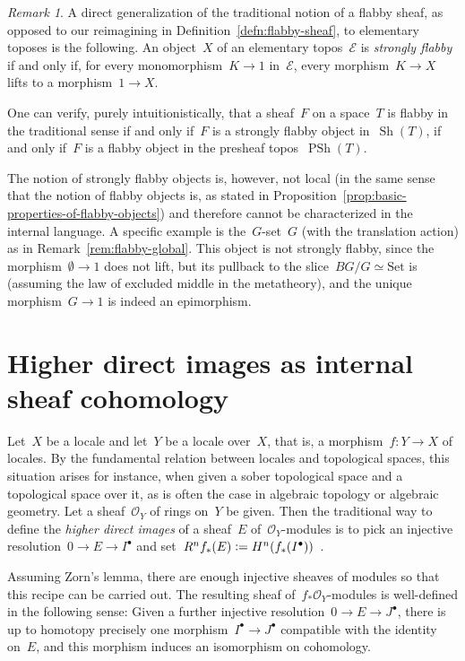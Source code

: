\documentclass[oneside]{amsart}
\theoremstyle{definition}
\theoremstyle{plain}
\theoremstyle{remark}
\newtheorem{rem}[defn]{Remark}
\newcommand{\E}{\mathcal{E}}
\renewcommand{\O}{\mathcal{O}}
\newcommand{\defeq}{\vcentcolon=}
\DeclareMathOperator{\Sh}{Sh}
\DeclareMathOperator{\PSh}{PSh}
\newcommand{\Set}{\mathrm{Set}}
\renewcommand{\_}{\mathpunct{.}\,}
\begin{document}
\begin{rem}A direct generalization of the traditional notion of a flabby sheaf, as
opposed to our reimagining in Definition~\ref{defn:flabby-sheaf}, to
elementary toposes is the following. An object~$X$ of an elementary topos~$\E$
is \emph{strongly flabby} if and only if, for every monomorphism~$K \to 1$
in~$\E$, every morphism~$K \to X$ lifts to a morphism~$1 \to X$.

One can verify, purely intuitionistically, that a sheaf~$F$ on a space~$T$ is
flabby in the traditional sense if and only if~$F$ is a strongly flabby object
in~$\Sh(T)$, if and only if~$F$ is a flabby object in the presheaf
topos~$\PSh(T)$.

The notion of strongly flabby objects is, however, not local (in the same sense
that the notion of flabby objects is, as stated in
Proposition~\ref{prop:basic-properties-of-flabby-objects})
and therefore cannot be characterized in the internal language. A specific
example is the~$G$-set~$G$ (with the translation action) as in
Remark~\ref{rem:flabby-global}.
This object is not strongly flabby, since the morphism~$\emptyset \to 1$ does
not lift, but its pullback to the slice~$BG/G \simeq \Set$ is (assuming
the law of excluded middle in the metatheory), and the unique morphism~$G \to
1$ is indeed an epimorphism.
\end{rem}


\section{Higher direct images as internal sheaf cohomology}
\label{sect:higher-direct-images}

Let~$X$ be a locale and let~$Y$ be a locale over~$X$, that is, a morphism~$f : Y \to X$ of locales. By the fundamental
relation between locales and topological spaces, this situation arises
for instance, when given a sober topological space and a topological
space over it, as is often the case in algebraic topology or algebraic
geometry. Let a sheaf~$\O_Y$ of rings on~$Y$ be given. Then the
traditional way to define the \emph{higher direct images} of a sheaf~$E$
of~$\O_Y$-modules is to pick an injective resolution~$0 \to E \to I^\bullet$
and set~$R^n f_*(E) \defeq H^n(f_*(I^\bullet))$~\cite[Tag~01DZ]{stacks-project}.

Assuming Zorn's lemma, there are enough injective sheaves of modules so
that this recipe can be carried out. The resulting sheaf
of~$f_*\O_Y$-modules is well-defined in the following sense: Given a further
injective resolution~$0 \to E \to J^\bullet$, there is up to homotopy precisely
one morphism~$I^\bullet \to J^\bullet$ compatible with the identity on~$E$, and
this morphism induces an isomorphism on cohomology.
\end{document}
